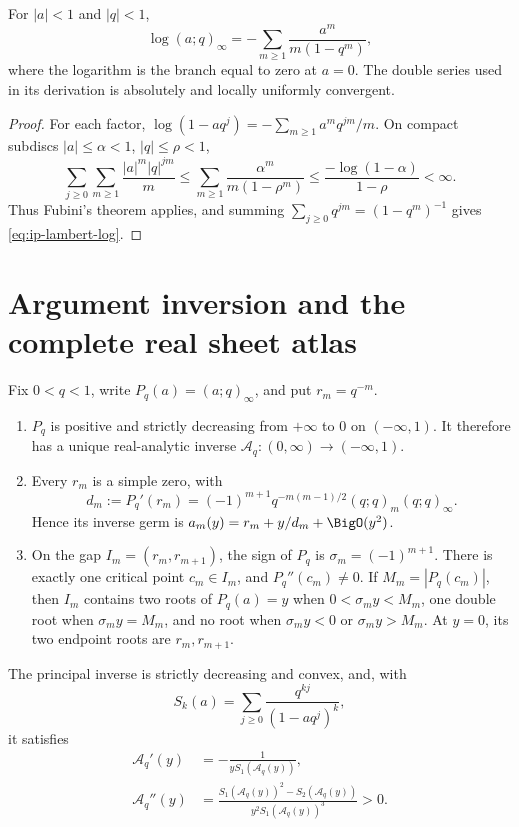 \begin{lemma}
\label{lem:ip-lambert-log}
For \(|a|<1\) and \(|q|<1\),
\begin{equation}
 \log(a;q)_\infty
 =-\sum_{m\geq1}\frac{a^m}{m(1-q^m)},
 \label{eq:ip-lambert-log}
\end{equation}
where the logarithm is the branch equal to zero at \(a=0\).  The double
series used in its derivation is absolutely and locally uniformly convergent.
\end{lemma}

\begin{proof}
For each factor,
\(\log(1-aq^j)=-\sum_{m\geq1}a^mq^{jm}/m\).  On compact subdiscs
\(|a|\leq\alpha<1\), \(|q|\leq\rho<1\),
\[
 \sum_{j\geq0}\sum_{m\geq1}\frac{|a|^m|q|^{jm}}m
 \leq\sum_{m\geq1}\frac{\alpha^m}{m(1-\rho^m)}
 \leq\frac{-\log(1-\alpha)}{1-\rho}<\infty.
\]
Thus Fubini's theorem applies, and summing
\(\sum_{j\geq0}q^{jm}=(1-q^m)^{-1}\) gives
\cref{eq:ip-lambert-log}.
\end{proof}

\section{Argument inversion and the complete real sheet atlas}
\label{sec:ip-argument-atlas}

\begin{theorem}
\label{thm:ip-real-atlas}
Fix \(0<q<1\), write \(P_q(a)=(a;q)_\infty\), and put
\(r_m=q^{-m}\).
\begin{enumerate}
\item \(P_q\) is positive and strictly decreasing from \(+\infty\) to \(0\)
  on \((-\infty,1)\).  It therefore has a unique real-analytic inverse
  \(\mathcal A_q:(0,\infty)\to(-\infty,1)\).
\item Every \(r_m\) is a simple zero, with
  \begin{equation}
   d_m:=P_q'(r_m)=(-1)^{m+1}q^{-m(m-1)/2}
   (q;q)_m(q;q)_\infty.
   \label{eq:ip-zero-derivative}
  \end{equation}
  Hence its inverse germ is \(a_m(y)=r_m+y/d_m+\BigO(y^2)\).
\item On the gap \(I_m=(r_m,r_{m+1})\), the sign of \(P_q\) is
  \(\sigma_m=(-1)^{m+1}\).  There is exactly one critical point
  \(c_m\in I_m\), and \(P_q''(c_m)\ne0\).  If
  \(M_m=|P_q(c_m)|\), then \(I_m\) contains two roots of \(P_q(a)=y\)
  when \(0<\sigma_my<M_m\), one double root when
  \(\sigma_my=M_m\), and no root when
  \(\sigma_my<0\) or \(\sigma_my>M_m\).  At \(y=0\), its two endpoint
  roots are \(r_m,r_{m+1}\).
\end{enumerate}
The principal inverse is strictly decreasing and convex, and, with
\[
 S_k(a)=\sum_{j\geq0}\frac{q^{kj}}{(1-aq^j)^k},
\]
it satisfies
\begin{align}
 \mathcal A_q'(y)&=-\frac1{yS_1(\mathcal A_q(y))},
 \label{eq:ip-principal-first}\\
 \mathcal A_q''(y)&=
 \frac{S_1(\mathcal A_q(y))^2-S_2(\mathcal A_q(y))}
 {y^2S_1(\mathcal A_q(y))^3}>0.
 \label{eq:ip-principal-second}
\end{align}
\end{theorem}

